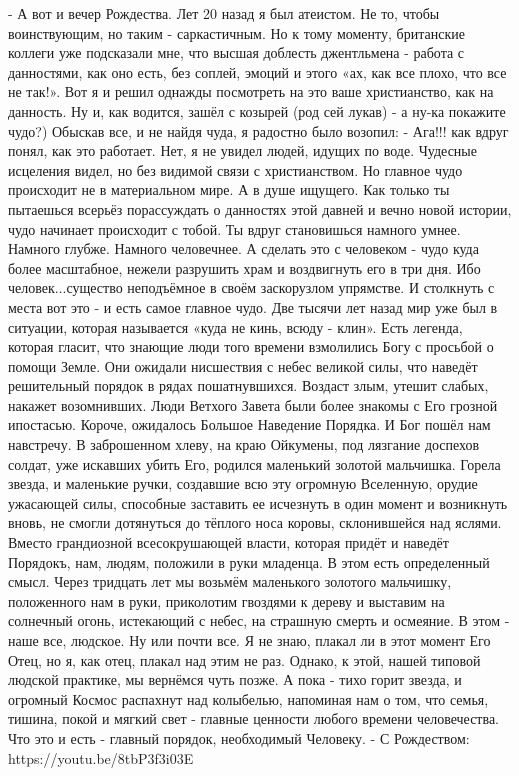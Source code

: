 - А вот и вечер Рождества.
Лет 20 назад я был атеистом. Не то, чтобы воинствующим, но таким - саркастичным. 
Но к тому моменту, британские коллеги уже подсказали мне, что высшая доблесть джентльмена - работа с данностями, как оно есть, без соплей, эмоций и этого «ах, как все плохо, что все не так!».
Вот я и решил однажды посмотреть на это ваше христианство, как на данность.
Ну и, как водится, зашёл с козырей (род сей лукав) - а ну-ка покажите чудо?)
Обыскав все, и не найдя чуда, я радостно было возопил:
- Ага!!!
как вдруг понял, как это работает. 
Нет, я не увидел людей, идущих по воде.
Чудесные исцеления видел, но без видимой связи с христианством. 
Но главное чудо происходит не в материальном мире.
А в душе ищущего. 
Как только ты пытаешься всерьёз порассуждать о данностях этой давней и вечно новой истории, чудо начинает происходит с тобой.
Ты вдруг становишься намного умнее. Намного глубже. Намного человечнее. 
А сделать это с человеком - чудо куда более масштабное, нежели разрушить храм и воздвигнуть его в три дня.
Ибо человек...существо неподъёмное в своём заскорузлом упрямстве.
И столкнуть с места вот это - и есть самое главное чудо. 
Две тысячи лет назад мир уже был в ситуации, которая называется «куда не кинь, всюду - клин».
Есть легенда, которая гласит, что знающие люди того времени взмолились Богу с просьбой о помощи Земле. 
Они ожидали нисшествия с небес великой силы, что наведёт решительный порядок в рядах пошатнувшихся. Воздаст злым, утешит слабых, накажет возомнивших. 
Люди Ветхого Завета были более знакомы с Его грозной ипостасью. 
Короче, ожидалось Большое Наведение Порядка.
И Бог пошёл нам навстречу.
В заброшенном хлеву, на краю Ойкумены, под лязгание доспехов солдат, уже искавших убить Его, родился маленький золотой мальчишка.
Горела звезда, и маленькие ручки, создавшие всю эту огромную Вселенную, орудие ужасающей силы, способные заставить ее исчезнуть в один момент и возникнуть вновь, не смогли дотянуться до тёплого носа коровы, склонившейся над яслями. 
Вместо грандиозной всесокрушающей власти, которая придёт и наведёт Порядокъ, нам, людям, положили в руки младенца. В этом есть определенный смысл. 
Через тридцать лет мы возьмём маленького золотого мальчишку, положенного нам в руки, приколотим гвоздями к дереву и выставим на солнечный огонь, истекающий с небес, на страшную смерть и осмеяние.
В этом - наше все, людское. Ну или почти все. 
Я не знаю, плакал ли в этот момент Его Отец, но я, как отец, плакал над этим не раз. 
Однако, к этой, нашей типовой людской практике, мы вернёмся чуть позже. 
А пока - тихо горит звезда, и огромный Космос распахнут над колыбелью, напоминая нам о том, что семья, тишина, покой и мягкий свет - главные ценности любого времени человечества. 
Что это и есть - главный порядок, необходимый Человеку. 
- С Рождеством:
https://youtu.be/8tbP3f3i03E
